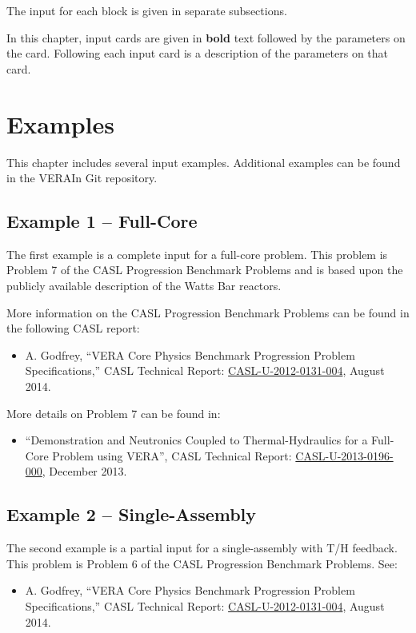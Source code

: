 \documentclass[11pt]{caslreport}
\begin{document}
The input for each block is given in separate subsections.

In this chapter, input cards are given in {\bf bold} text followed by the parameters on the card.
Following each input card is a description of the parameters on that card.



\clearpage
\section{Examples}
\label{chap:example}

This chapter includes several input examples.  Additional examples can be found in the VERAIn Git repository.

\subsection{Example 1 -- Full-Core}
The first example is a complete input for a full-core problem.
This problem is Problem 7 of the CASL Progression Benchmark Problems and
is based upon the publicly available description of the Watts Bar reactors.

More information on the CASL Progression Benchmark Problems can be found in the following CASL report:
\begin{itemize}
\item A. Godfrey, ``VERA Core Physics Benchmark Progression Problem Specifications,''
CASL Technical Report: \href{http://www.casl.gov/sites/default/files/docs/CASL-U-2012-0131-004.pdf}{CASL-U-2012-0131-004}, August 2014.
\end{itemize}

More details on Problem 7 can be found in:
\begin{itemize}
\item ``Demonstration and Neutronics Coupled to Thermal-Hydraulics for a Full-Core Problem using VERA'',
CASL Technical Report: \href{http://www.casl.gov/sites/default/files/docs/CASL-U-2013-0196-000.pdf}{CASL-U-2013-0196-000}, December 2013.
\end{itemize}



\subsection{Example 2 -- Single-Assembly}
The second example is a partial input for a single-assembly with T/H feedback.
This problem is Problem 6 of the CASL Progression Benchmark Problems.  See:
\begin{itemize}
\item A. Godfrey, ``VERA Core Physics Benchmark Progression Problem Specifications,''
CASL Technical Report: \href{http://www.casl.gov/docs/CASL-U-2012-0131-004.pdf}{CASL-U-2012-0131-004}, August 2014.
\end{itemize}
\end{document}
